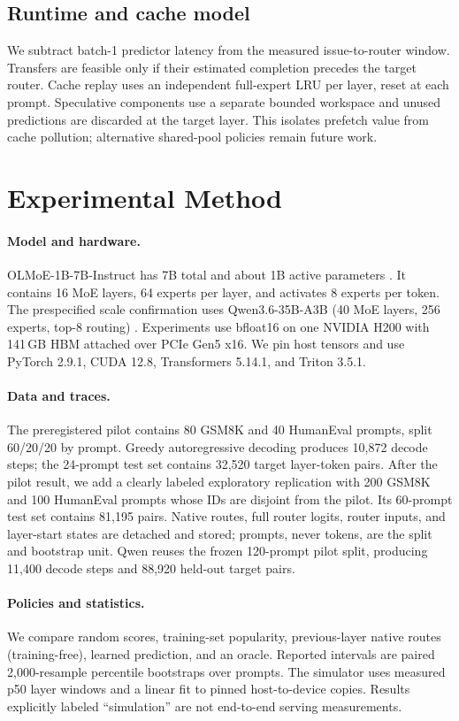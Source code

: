 \documentclass[10pt,twocolumn]{article}
\begin{document}
\subsection{Runtime and cache model}
We subtract batch-1 predictor latency from the measured issue-to-router
window.  Transfers are feasible only if their estimated completion precedes
the target router.  Cache replay uses an independent full-expert LRU per layer,
reset at each prompt.  Speculative components use a separate bounded workspace
and unused predictions are discarded at the target layer.  This isolates
prefetch value from cache pollution; alternative shared-pool policies remain
future work.

\section{Experimental Method}
\paragraph{Model and hardware.}
OLMoE-1B-7B-Instruct has 7B total and about 1B active parameters
\cite{muennighoff2024olmoe}.  It contains 16 MoE layers, 64 experts per layer,
and activates 8 experts per token.  The prespecified scale confirmation uses
Qwen3.6-35B-A3B (40 MoE layers, 256 experts, top-8 routing)
\cite{qwen2026qwen36}.  Experiments use bfloat16 on one NVIDIA H200 with
141\,GB HBM attached over PCIe Gen5 x16.  We pin host tensors and use PyTorch
2.9.1, CUDA 12.8, Transformers 5.14.1, and Triton 3.5.1.

\paragraph{Data and traces.}
The preregistered pilot contains 80 GSM8K and 40 HumanEval prompts, split
60/20/20 by prompt.  Greedy autoregressive decoding produces 10,872 decode
steps; the 24-prompt test set contains 32,520 target layer-token pairs.
After the pilot result, we add a clearly labeled exploratory replication with
200 GSM8K and 100 HumanEval prompts whose IDs are disjoint from the pilot.
Its 60-prompt test set contains 81,195 pairs.  Native routes, full router logits,
router inputs, and layer-start states are detached and stored; prompts, never
tokens, are the split and bootstrap unit.  Qwen reuses the frozen 120-prompt
pilot split, producing 11,400 decode steps and 88,920 held-out target pairs.

\paragraph{Policies and statistics.}
We compare random scores, training-set popularity, previous-layer native
routes (training-free), learned prediction, and an oracle.  Reported intervals
are paired 2,000-resample percentile bootstraps over prompts.  The simulator
uses measured p50 layer windows and a linear fit to pinned host-to-device
copies.  Results explicitly labeled ``simulation'' are not end-to-end serving
measurements.
\end{document}
